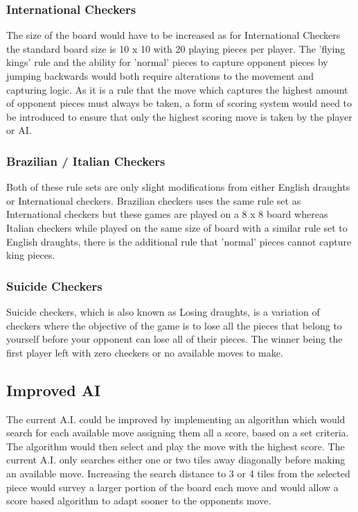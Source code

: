 \documentclass[10pt, a4paper]{article}
\begin{document}
    \subsubsection{International Checkers}
    The size of the board would have to be increased as for International Checkers the standard board size is 10 x 10 with 20 playing pieces per player. The 'flying kings' rule and the ability for 'normal' pieces to capture 
    \newline
    opponent pieces by jumping backwards would both 
    \newline
    require alterations to the movement and capturing logic.    
    As it is a rule that the move which captures the highest amount of opponent pieces must always be taken, a form of scoring system would need to be introduced to ensure that only the highest scoring move is taken by the player or AI.
    
    \subsubsection{Brazilian / Italian Checkers}
    Both of these rule sets are only slight modifications from either English draughts or International checkers. 
    \newline
    Brazilian checkers uses the same rule set as International checkers but these games are played on a 8 x 8 board whereas Italian checkers while played on the same size of board with a similar rule set to English draughts, there is the additional rule that 'normal' pieces cannot capture king pieces.
    
    \subsubsection{Suicide Checkers}
    Suicide checkers, which is also known as Losing draughts, is a variation of checkers where the objective of the game is to lose all the pieces that belong to 
    \newline
    yourself before your opponent can lose all of their pieces. The winner being the first player left with zero checkers or no available moves to make. 
    
    \subsection{Improved AI}
    The current A.I. could be improved by implementing an 
    \newline
    algorithm which would search for each available move 
    \newline
    assigning them all a score, based on a set criteria. The algorithm would then select and play the move with the highest score.
    \newline 
    The current A.I. only searches either one or two tiles away diagonally before making an available move. Increasing the search distance to 3 or 4 tiles from the selected piece would survey a larger portion of the board each move and would allow a score based algorithm to adapt sooner to the opponents move. 
    
\end{document}
